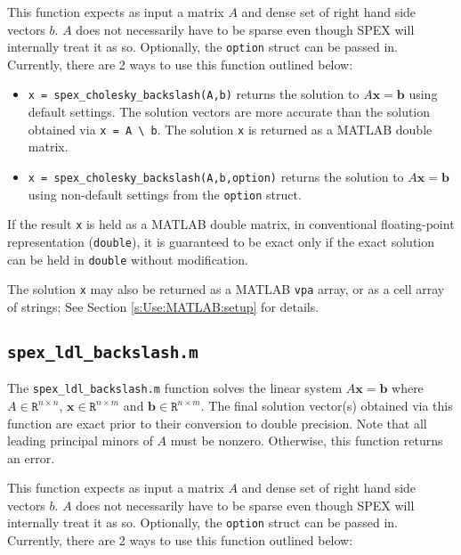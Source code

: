 \documentclass[12pt,oneside]{book}
\theoremstyle{definition}
\renewcommand{\b}{\mathbf{b}}
\newcommand{\x}{\mathbf{x}}
\begin{document}
This function expects as input a matrix $A$ and dense set of
right hand side vectors $b$. $A$ does not necessarily have to be sparse
even though SPEX will internally treat it as so.
Optionally, the \verb|option| struct can be passed in.
Currently, there are 2 ways to use this function outlined below:

\begin{itemize}

\item \verb|x = spex_cholesky_backslash(A,b)| returns the solution to $A \x =
\b$ using default settings. The solution vectors are more accurate than
the solution obtained via \verb|x = A \ b|.  The solution \verb|x| is
returned as a MATLAB double matrix.

\item \verb|x = spex_cholesky_backslash(A,b,option)| returns the solution to $A \x =
\b$ using non-default settings from the \verb|option| struct.

\end{itemize}

If the result \verb|x| is held as a MATLAB double matrix, in conventional
floating-point representation (\verb|double|), it is guaranteed to be exact
only if the exact solution can be held in \verb|double| without modification.

The solution \verb|x| may also be returned as a MATLAB \verb|vpa| array, or as
a cell array of strings; See Section \ref{s:Use:MATLAB:setup} for details.

\subsection{\texttt{spex\_ldl\_backslash.m}}
The \verb|spex_ldl_backslash.m| function solves the linear system $A \x = \b$ where
$A \in \mathtt{R}^{n \times n}$, $\x \in \mathtt{R}^{n \times m}$ and $\b \in
\mathtt{R}^{n \times m}$. The final solution vector(s) obtained via this
function are exact prior to their conversion to double precision. Note that
all leading principal minors of $A$ must be nonzero.
Otherwise, this function returns an error.

This function expects as input a matrix $A$ and dense set of
right hand side vectors $b$. $A$ does not necessarily have to be sparse
even though SPEX will internally treat it as so.
Optionally, the \verb|option| struct can be passed in.
Currently, there are 2 ways to use this function outlined below:
\end{document}
